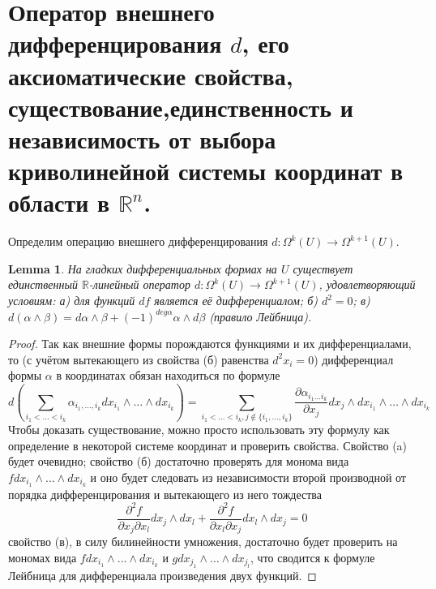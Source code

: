 \documentclass[a4paper,12pt]{article} %
\newtheorem{lemma}[theorem]{Lemma}
\theoremstyle{definition}
\begin{document}
\section{Оператор внешнего дифференцирования $d$, его аксиоматические свойства, существование,единственность и независимость от выбора криволинейной системы координат в области в $\mathbb{R}^n$.}
Определим операцию внешнего дифференцирования $d : \Omega^k (U) \rightarrow \Omega^{k+1} (U)$.
\begin{lemma}
	На гладких дифференциальных формах на $U$ существует единственный $\mathbb{R}$-линейный оператор $d : \Omega^k (U) \rightarrow \Omega^{k+1} (U)$, удовлетворяющий условиям: а) для функций $df$ является её дифференциалом; б) $d^2=  0$; в) $d(\alpha \wedge \beta)  =d \alpha \wedge \beta + (-1)^{deg \alpha} \alpha \wedge d \beta$ (правило Лейбница).
\end{lemma}
\begin{proof}
	Так как внешние формы порождаются функциями и их дифференциалами, то (с учётом вытекающего из свойства (б) равенства $d^2x_i= 0$) дифференциал формы $\alpha$ в координатах обязан находиться по формуле
	\begin{equation}
		d( \sum_{i_1 < \dots < i_k} \alpha_{i_1,\dots,i_k} d x_{i_1} \wedge \dots \wedge dx_{i_k}) = \sum_{i_1 < \dots < i_k, j \notin \{ i_1, \dots, i_k \}} \frac{\partial \alpha_{i_1 \dots i_k}}{\partial x_j} d x_j \wedge d x_{i_1} \wedge \dots \wedge d x_{i_k}
	\end{equation}
	Чтобы доказать существование, можно просто использовать эту формулу как определение в некоторой системе координат и проверить свойства. Свойство (a) будет очевидно; свойство (б) достаточно проверять для монома вида $fdx_{i_1}\wedge \dots \wedge dx_{i_k}$ и оно будет следовать из независимости второй производной от порядка дифференцирования и вытекающего из него тождества
	\begin{equation}
		\frac{\partial^2 f}{\partial x_j \partial x_l} dx_j \wedge dx_l + \frac{\partial^2 f}{\partial x_l \partial x_j} dx_l \wedge dx_j = 0
	\end{equation}
	свойство (в), в силу билинейности умножения, достаточно будет проверить на мономах вида $fdx_{i_1}\wedge \dots \wedge dx_{i_k}$ и $gdx_{j_1}\wedge \dots \wedge dx_{j_l}$, что сводится к формуле Лейбница для дифференциала произведения двух функций. 
\end{proof}
\end{document}

